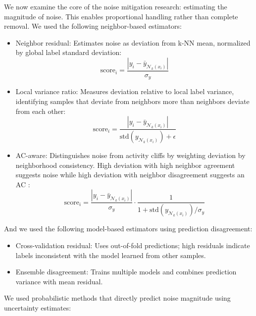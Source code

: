 We now examine the core of the noise mitigation research: estimating the magnitude of noise. This enables proportional handling rather than complete removal. We used the following neighbor-based estimators:

\begin{itemize}
    \item Neighbor residual: Estimates noise as deviation from k-NN mean, normalized by global label standard deviation:
    $$\text{score}_i = \frac{|y_i - \bar{y}_{\mathcal{N}_k(x_i)}|}{\sigma_y}$$
    
    \item Local variance ratio: Measures deviation relative to local label variance, identifying samples that deviate from neighbors more than neighbors deviate from each other:
    $$\text{score}_i = \frac{|y_i - \bar{y}_{\mathcal{N}_k(x_i)}|}{\text{std}(y_{\mathcal{N}_k(x_i)}) + \epsilon}$$
    
    \item AC-aware: Distinguishes noise from activity cliffs by weighting deviation by neighborhood consistency. High deviation with high neighbor agreement suggests noise while high deviation with neighbor disagreement suggests an AC \citep{Dablander2023}:
    $$\text{score}_i = \frac{|y_i - \bar{y}_{\mathcal{N}_k(x_i)}|}{\sigma_y} \cdot \frac{1}{1 + \text{std}(y_{\mathcal{N}_k(x_i)})/\sigma_y}$$
\end{itemize}

And we used the following model-based estimators using prediction disagreement:

\begin{itemize}
    \item Cross-validation residual: Uses out-of-fold predictions; high residuals indicate labels inconsistent with the model learned from other samples.
    \item Ensemble disagreement: Trains multiple models and combines prediction variance with mean residual.
\end{itemize}

We used probabilistic methods that directly predict noise magnitude using uncertainty estimates:

